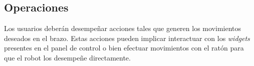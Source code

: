\subsection{Operaciones}

Los usuarios deberán desempeñar acciones tales que generen los movimientos deseados en el brazo. Estas acciones pueden implicar interactuar con los \textit{widgets} presentes en el panel de control o bien efectuar movimientos con el ratón para que el robot los desempeñe directamente.

